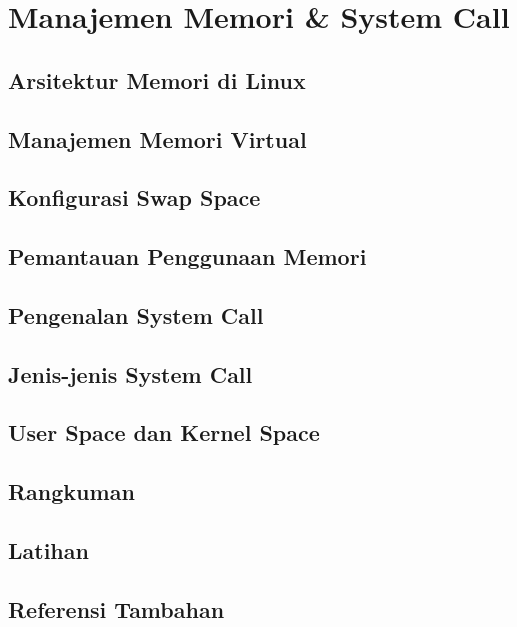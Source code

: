 
\chapter{Manajemen Memori \& System Call}
\label{ch:memory-and-syscalls}

\begin{abstract}
Bab ini membahas arsitektur memori di Linux, manajemen memori virtual,
swap space, dan pengenalan system call.
\end{abstract}

\section{Arsitektur Memori di Linux}
\section{Manajemen Memori Virtual}
\section{Konfigurasi Swap Space}
\section{Pemantauan Penggunaan Memori}
\section{Pengenalan System Call}
\section{Jenis-jenis System Call}
\section{User Space dan Kernel Space}
\section{Rangkuman}
\section{Latihan}
\section{Referensi Tambahan}
